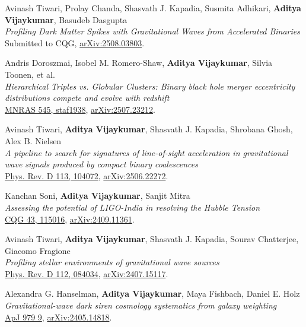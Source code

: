 \begin{etaremune}
        \item Avinash Tiwari, Prolay Chanda, Shasvath J. Kapadia, Susmita Adhikari, \textbf{Aditya Vijaykumar}, Basudeb Dasgupta\\
        \textit{Profiling Dark Matter Spikes with Gravitational Waves from Accelerated Binaries}\\
        Submitted to CQG, \href{https://arxiv.org/abs/2508.03803}{arXiv:2508.03803}.

        \item Andris Doroszmai, Isobel M. Romero-Shaw, \textbf{Aditya Vijaykumar}, Silvia Toonen, et al.\\
        \textit{Hierarchical Triples vs. Globular Clusters: Binary black hole merger eccentricity distributions compete and evolve with redshift}\\
        \href{https://doi.org/10.1093/mnras/staf1938}{MNRAS 545, staf1938}, \href{https://arxiv.org/abs/2507.23212}{arXiv:2507.23212}.

        \item \student Avinash Tiwari, \textbf{Aditya Vijaykumar}, Shasvath J. Kapadia, Shrobana Ghosh, Alex B. Nielsen\\
        \textit{A pipeline to search for signatures of line-of-sight acceleration in gravitational wave signals produced by compact binary coalescences}\\
        \href{https://doi.org/10.1103/qtw8-3g56}{Phys. Rev. D 113, 104072}, \href{https://arxiv.org/abs/2506.22272}{arXiv:2506.22272}.

        \item Kanchan Soni, \textbf{Aditya Vijaykumar}, Sanjit Mitra\\
        \textit{Assessing the potential of LIGO-India in resolving the Hubble Tension}\\
        \href{https://doi.org/10.1088/1361-6382/ae6f64}{CQG 43, 115016}, \href{https://arxiv.org/abs/2409.11361}{arXiv:2409.11361}.

        \item \student Avinash Tiwari, \textbf{Aditya Vijaykumar}, Shasvath J. Kapadia, Sourav Chatterjee, Giacomo Fragione\\
        \textit{Profiling stellar environments of gravitational wave sources}\\
        \href{https://journals.aps.org/prd/abstract/10.1103/gspl-m478}{Phys. Rev. D 112, 084034}, \href{https://arxiv.org/abs/2407.15117}{arXiv:2407.15117}.
        
	\item
	Alexandra G. Hanselman, \textbf{Aditya Vijaykumar}, Maya Fishbach, Daniel E. Holz  \\
	\textit{Gravitational-wave dark siren cosmology systematics from galaxy weighting}\\
	\href{https://iopscience.iop.org/article/10.3847/1538-4357/ad9393}{ApJ 979 9}, \href{https://arxiv.org/abs/2405.14818}{arXiv:2405.14818}.


\end{etaremune}
